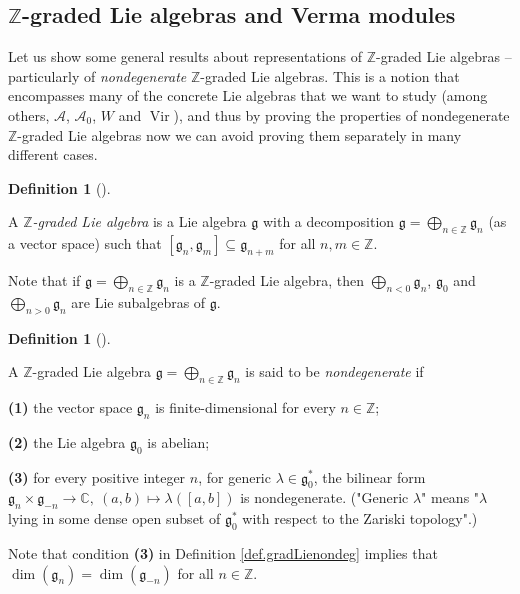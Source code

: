 \documentclass
[numbers=enddot,12pt,final,onecolumn,german,notitlepage]{scrartcl}%
\theoremstyle{definition}
\newtheorem{defi}[theo]{Definition}
\newenvironment{definition}[1][]
{\begin{defi}[#1]\begin{leftbar}}
{\end{leftbar}\end{defi}}
\begin{document}
\subsection{$\mathbb{Z}$-graded Lie algebras and Verma modules}

Let us show some general results about representations of $\mathbb{Z}$-graded
Lie algebras -- particularly of \textit{nondegenerate} $\mathbb{Z}$-graded Lie
algebras. This is a notion that encompasses many of the concrete Lie algebras
that we want to study (among others, $\mathcal{A}$, $\mathcal{A}_{0}$, $W$ and
$\operatorname*{Vir}$), and thus by proving the properties of nondegenerate
$\mathbb{Z}$-graded Lie algebras now we can avoid proving them separately in
many different cases.

\begin{definition}
\label{def.gradLie}A $\mathbb{Z}$\textit{-graded Lie algebra} is a Lie algebra
$\mathfrak{g}$ with a decomposition $\mathfrak{g}=\bigoplus\limits_{n\in
\mathbb{Z}}\mathfrak{g}_{n}$ (as a vector space) such that $\left[
\mathfrak{g}_{n},\mathfrak{g}_{m}\right]  \subseteq\mathfrak{g}_{n+m}$ for all
$n,m\in\mathbb{Z}$.
\end{definition}

Note that if $\mathfrak{g}=\bigoplus\limits_{n\in\mathbb{Z}}\mathfrak{g}_{n}$
is a $\mathbb{Z}$-graded Lie algebra, then $\bigoplus\limits_{n<0}%
\mathfrak{g}_{n}$, $\mathfrak{g}_{0}$ and $\bigoplus\limits_{n>0}%
\mathfrak{g}_{n}$ are Lie subalgebras of $\mathfrak{g}$.

\begin{definition}
\label{def.gradLienondeg}A $\mathbb{Z}$-graded Lie algebra $\mathfrak{g}%
=\bigoplus\limits_{n\in\mathbb{Z}}\mathfrak{g}_{n}$ is said to be
\textit{nondegenerate} if

\textbf{(1)} the vector space $\mathfrak{g}_{n}$ is finite-dimensional for
every $n\in\mathbb{Z}$;

\textbf{(2)} the Lie algebra $\mathfrak{g}_{0}$ is abelian;

\textbf{(3)} for every positive integer $n$, for generic $\lambda
\in\mathfrak{g}_{0}^{\ast}$, the bilinear form $\mathfrak{g}_{n}%
\times\mathfrak{g}_{-n}\rightarrow\mathbb{C},\ \left(  a,b\right)
\mapsto\lambda\left(  \left[  a,b\right]  \right)  $ is nondegenerate.
("Generic $\lambda$" means "$\lambda$ lying in some dense open subset of
$\mathfrak{g}_{0}^{\ast}$ with respect to the Zariski topology".)
\end{definition}

Note that condition \textbf{(3)} in Definition \ref{def.gradLienondeg} implies
that $\dim\left(  \mathfrak{g}_{n}\right)  =\dim\left(  \mathfrak{g}%
_{-n}\right)  $ for all $n\in\mathbb{Z}$.
\end{document}
